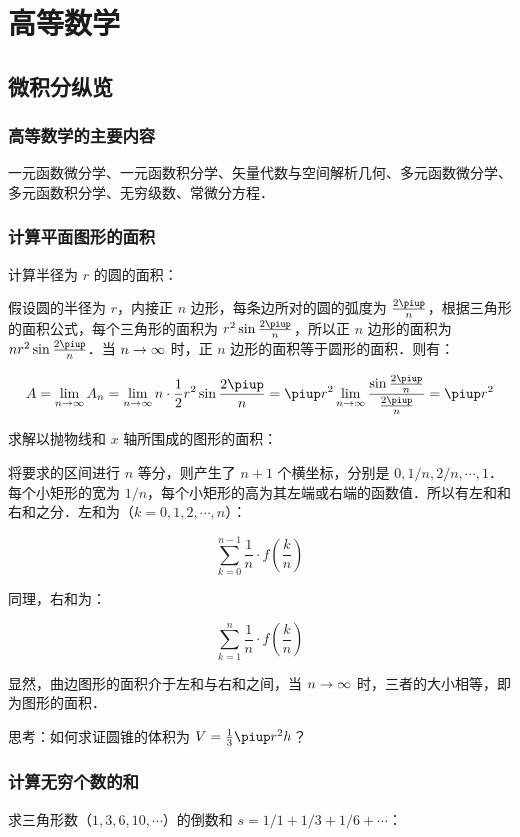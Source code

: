 \documentclass[shortmath]{AirNote}
\begin{document}
\chapter{高等数学}
\section{微积分纵览}
\subsection{高等数学的主要内容}
一元函数微分学、一元函数积分学、矢量代数与空间解析几何、多元函数微分学、多元函数积分学、无穷级数、常微分方程．

\subsection{计算平面图形的面积}
计算半径为 $r$ 的圆的面积：

假设圆的半径为 $r$，内接正 $n$ 边形，每条边所对的圆的弧度为 $\frac{2\p}{n}$，根据三角形的面积公式，每个三角形的面积为 $r^2\sin \frac{2\p}{n}$，所以正 $n$ 边形的面积为 $nr^2\sin \frac{2\p}{n}$．当 $n\rightarrow\infty$ 时，正 $n$ 边形的面积等于圆形的面积．则有：

\begin{equation}
	A = \lim_{n\ra\infty}A_n = \lim_{n\ra\infty} n\cdot\frac 1 2 r^2 \sin \frac {2\p} n = \p r^2 \lim_{n\ra\infty}\frac{\sin \frac{2\p}{n}}{\frac{2\p}{n}}=\p r^2
\end{equation}

求解以抛物线和 $x$ 轴所围成的图形的面积：

将要求的区间进行 $n$ 等分，则产生了 $n+1$ 个横坐标，分别是 $0, 1/n , 2/n , \cdots, 1$．每个小矩形的宽为 $1/n$，每个小矩形的高为其左端或右端的函数值．所以有左和和右和之分．左和为（$k = {0,1,2,\cdots,n}$）：

\begin{equation}
	\sum_{k=0}^{n-1}\frac 1n \cdot f\left(\frac kn\right)
\end{equation}

同理，右和为：

\begin{equation}
	\sum_{k=1}^{n}\frac 1n \cdot f\left(\frac kn\right)
\end{equation}

显然，曲边图形的面积介于左和与右和之间，当 $n\rightarrow\infty$ 时，三者的大小相等，即为图形的面积．

思考：如何求证圆锥的体积为 $V = \frac 13 \p r^2 h$？

\subsection{计算无穷个数的和}
求三角形数（$1,3,6,10,\cdots$）的倒数和 $s = 1/1 + 1/3 + 1/6 + \cdots$：
\end{document}
